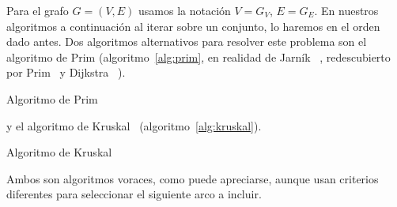   Para el grafo \(G = (V, E)\)
  usamos la notación \(V = G_V\), \(E = G_E\).
  En nuestros algoritmos a continuación al iterar sobre un conjunto,
  lo haremos en el orden dado antes.
  Dos algoritmos alternativos para resolver este problema
  son el algoritmo de Prim
  (algoritmo~\ref{alg:prim},
   en realidad de Jarník~%
     \cite{jarnik30:_MST},
   redescubierto por Prim~%
     \cite{prim57:_MST}
   y Dijkstra~%
     \cite{dijkstra59:_MST}).
  \begin{algorithm}
    \DontPrintSemicolon\Indp

    \caption{Algoritmo de Prim}
    \label{alg:prim}
  \end{algorithm}
  y el algoritmo de Kruskal~%
   \cite{kruskal56:_MST}
  (algoritmo~\ref{alg:kruskal}).
  \begin{algorithm}
    \DontPrintSemicolon\Indp

    \caption{Algoritmo de Kruskal}
    \label{alg:kruskal}
  \end{algorithm}
  Ambos son algoritmos voraces,
  como puede apreciarse,
  aunque usan criterios diferentes
  para seleccionar el siguiente arco a incluir.

